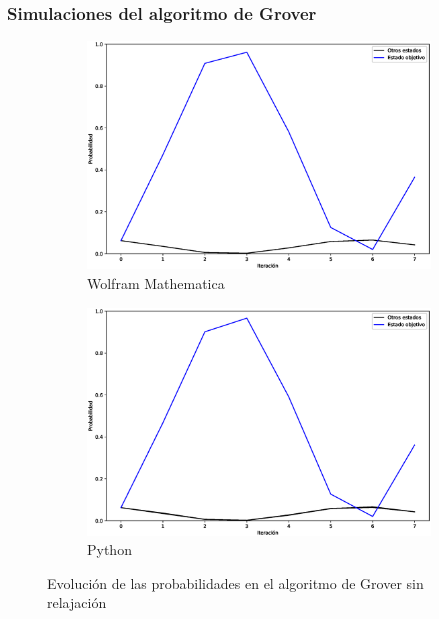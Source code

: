 \documentclass[xetex,mathserif,serif]{beamer}
\begin{document}
\begin{frame}
    \frametitle{Simulaciones del algoritmo de Grover}

\begin{figure}[H]
    \centering
    \begin{subfigure}[m]{0.49\textwidth}
        \centering
        \includegraphics[width=0.9\linewidth]{img/groverallM.eps}
        \caption{Wolfram Mathematica}
    \end{subfigure}
    \begin{subfigure}[m]{0.49\textwidth}
        \centering
        \includegraphics[width=0.9\linewidth]{img/groveralllossless.eps}
        \caption{Python}
    \end{subfigure}
    \caption[Evolución de las probabilidades en el algoritmo de Grover sin relajación]{Evolución de las probabilidades en el algoritmo de Grover sin relajación}
    \label{fig:groverlosslesscomp1111}
\end{figure}



\end{frame}
\end{document}

